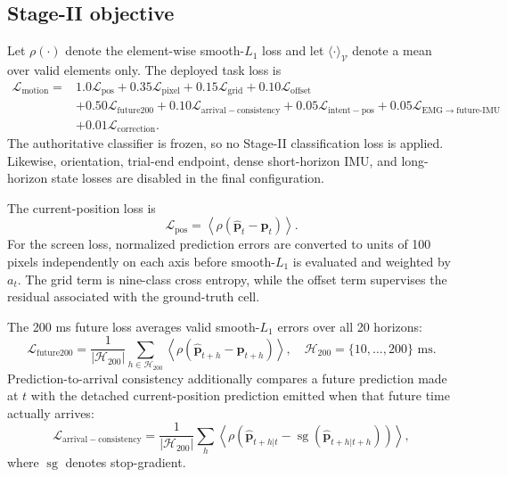 \subsection{Stage-II objective}

Let $\rho(\cdot)$ denote the element-wise smooth-$L_1$ loss and let
$\langle\cdot\rangle_{\mathcal{V}}$ denote a mean over valid elements only.  The
deployed task loss is
\begin{align}
 \mathcal{L}_{\mathrm{motion}} ={}&
  1.0\mathcal{L}_{\mathrm{pos}}
 +0.35\mathcal{L}_{\mathrm{pixel}}
 +0.15\mathcal{L}_{\mathrm{grid}}
 +0.10\mathcal{L}_{\mathrm{offset}} \nonumber\\
 &+0.50\mathcal{L}_{\mathrm{future200}}
 +0.10\mathcal{L}_{\mathrm{arrival-consistency}}
 +0.05\mathcal{L}_{\mathrm{intent-pos}}
 +0.05\mathcal{L}_{\mathrm{EMG\rightarrow future\text{-}IMU}} \nonumber\\
 &+0.01\mathcal{L}_{\mathrm{correction}}.
\end{align}
The authoritative classifier is frozen, so no Stage-II classification loss is
applied.  Likewise, orientation, trial-end endpoint, dense short-horizon IMU,
and long-horizon state losses are disabled in the final configuration.

The current-position loss is
\begin{equation}
 \mathcal{L}_{\mathrm{pos}}
 =\left\langle\rho(\hat{\mathbf{p}}_t-\mathbf{p}_t)\right\rangle.
\end{equation}
For the screen loss, normalized prediction errors are converted to units of
100 pixels independently on each axis before smooth-$L_1$ is evaluated and
weighted by $a_t$.  The grid term is nine-class cross entropy, while the offset
term supervises the residual associated with the ground-truth cell.

The 200 ms future loss averages valid smooth-$L_1$ errors over all 20 horizons:
\begin{equation}
 \mathcal{L}_{\mathrm{future200}}
 = \frac{1}{|\mathcal{H}_{200}|}
   \sum_{h\in\mathcal{H}_{200}}
   \left\langle\rho(\hat{\mathbf{p}}_{t+h}-\mathbf{p}_{t+h})\right\rangle,
 \quad \mathcal{H}_{200}=\{10,\ldots,200\}\text{ ms}.
\end{equation}
Prediction-to-arrival consistency additionally compares a future prediction
made at $t$ with the detached current-position prediction emitted when that
future time actually arrives:
\begin{equation}
 \mathcal{L}_{\mathrm{arrival-consistency}}
 = \frac{1}{|\mathcal{H}_{200}|}\sum_h
 \left\langle\rho(\hat{\mathbf{p}}_{t+h|t}
 -\operatorname{sg}(\hat{\mathbf{p}}_{t+h|t+h}))\right\rangle,
\end{equation}
where $\operatorname{sg}$ denotes stop-gradient.

